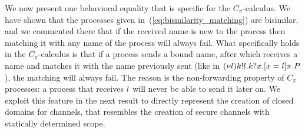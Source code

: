 %
%
%
%
%
%
%



We now present one behavioral equality that is specific for the $C_\pi$-calculus. 
We have shown that the processes given in~(\ref{eq:bismilarity_matching}) are bisimilar, and we commented there that if the received name is new to the process then matching it with any name of the process will always fail. What specifically holds in the $C_\pi$-calculus is that if a process sends a bound name, after which receives a name and matches it with the name previously sent (like in $(\nu l)k!l.k?x.[ x = l ]\pi.P$), the matching will always fail. The reason is the non-forwarding property of $C_\pi$ processes: a process that receives $l$ will never be able to send it later on.
We exploit this feature in the next result to directly represent the creation of closed domains for channels, that resembles the creation of secure channels with statically determined scope. %

